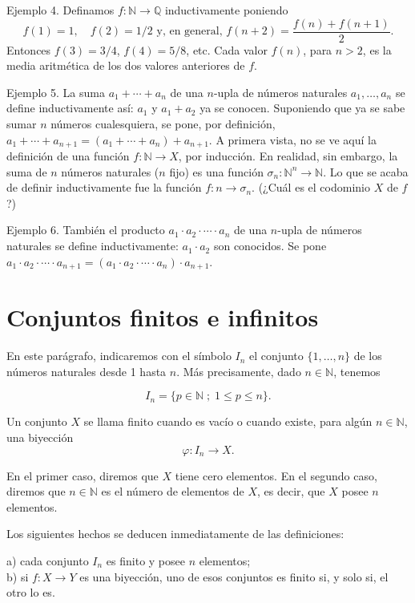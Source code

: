 Ejemplo 4. Definamos \(f: \mathbb{N} \to \mathbb{Q}\) inductivamente poniendo
\[
f(1) = 1,\quad f(2) = 1/2 \text{ y, en general, } f(n+2) = \frac{f(n) + f(n+1)}{2}.
\]
Entonces \(f(3) = 3/4\), \(f(4) = 5/8\), etc. Cada valor \(f(n)\), para \(n > 2\), es la media aritmética de los dos valores anteriores de \(f\).

Ejemplo 5. La suma \(a_1 + \cdots + a_n\) de una \(n\)-upla de números naturales \(a_1, \ldots, a_n\) se define inductivamente así: \(a_1\) y \(a_1 + a_2\) ya se conocen. Suponiendo que ya se sabe sumar \(n\) números cualesquiera, se pone, por definición, \(a_1 + \cdots + a_{n+1} = (a_1 + \cdots + a_n) + a_{n+1}\). A primera vista, no se ve aquí la definición de una función \(f: \mathbb{N} \to X\), por inducción. En realidad, sin embargo, la suma de \(n\) números naturales (\(n\) fijo) es una función \(\sigma_n: \mathbb{N}^n \to \mathbb{N}\). Lo que se acaba de definir inductivamente fue la función \(f: n \to \sigma_n\). (¿Cuál es el codominio \(X\) de \(f\)?)

Ejemplo 6. También el producto \(a_1 \cdot a_2 \cdot \cdots \cdot a_n\) de una \(n\)-upla de números naturales se define inductivamente: \(a_1 \cdot a_2\) son conocidos. Se pone \(a_1 \cdot a_2 \cdot \cdots \cdot a_{n+1} = (a_1 \cdot a_2 \cdot \cdots \cdot a_n) \cdot a_{n+1}\).

\section{Conjuntos finitos e infinitos}

En este parágrafo, indicaremos con el símbolo \(I_n\) el conjunto \(\{1, \ldots, n\}\) de los números naturales desde 1 hasta \(n\). Más precisamente, dado \(n \in \mathbb{N}\), tenemos

\[
I_n = \{p \in \mathbb{N} \; ; \; 1 \leq p \leq n\}.
\]

Un conjunto \(X\) se llama finito cuando es vacío o cuando existe, para algún \(n \in \mathbb{N}\), una biyección
\[
\varphi: I_n \to X.
\]

En el primer caso, diremos que \(X\) tiene cero elementos. En el segundo caso, diremos que \(n \in \mathbb{N}\) es el número de elementos de \(X\), es decir, que \(X\) posee \(n\) elementos.

Los siguientes hechos se deducen inmediatamente de las definiciones:

a) cada conjunto \(I_n\) es finito y posee \(n\) elementos;\\
b) si \(f: X \to Y\) es una biyección, uno de esos conjuntos es finito si, y solo si, el otro lo es.

